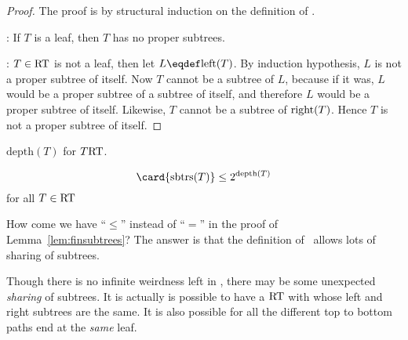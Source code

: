 \begin{proof}
The proof is by structural induction on the definition of \rectree.

: If $T$ is a leaf, then $T$ has no proper
subtrees.

: $T \in \rectree$ is not a leaf, then
let $L \eqdef \leftsub{T}$.  By induction hypothesis, $L$ is not a
proper subtree of itself.  Now $T$ cannot be a subtree of $L$, because
if it was, $L$ would be a proper subtree of a subtree of itself, and
therefore $L$ would be a proper subtree of itself.  Likewise, $T$
cannot be a subtree of $\text{right}(T)$.  Hence $T$ is not a proper
subtree of itself.
\end{proof}

\iffalse
\begin{lemma}\label{lem:finsubtrees}
Every tree in \rectree\ has only a finite number of subtrees.
\end{lemma}

\begin{proof}
The proof is by structural induction on the definition of \rectree.

\inductioncase{Base case}: If $T$ is a leaf, then $T$ has only one
subtree, namely, itself.

\inductioncase{Constructor case}: If $T \in \rectree$ is not a leaf,
then $\card{\subtr{\leftsub{T}}}$ and $\card{\subtr{\rightsub{T}}}$ are
finite by induction hypothesis.  Therefore
\[
\card{\subtr{T}} \leq 1 + \card{\subtr{\leftsub{T}}} +
\card{\subtr{\rightsub{T}}}.
\]
\end{proof}
\fi

\begin{definition}
$\text{depth}(T)$ for $T \text{RT}$.
\end{definition}

\begin{lemma}\label{}
\[
\card{\subtr{T}} \leq 2^{\text{depth}(T)}
\]
for all $T \in \rectree$
\end{lemma}

\iffalse
How come we have ``$\leq$'' instead of ``$=$'' in the proof of
Lemma~\ref{lem:finsubtrees}?  The answer is that the definition of
\rectree\ allows lots of sharing of subtrees.

Though there is no infinite weirdness left in \rectree, there may be
some unexpected \emph{sharing} of subtrees.  It is actually is
possible to have a $\text{RT}$ with whose left and right subtrees are
the same.  It is also possible for all the different top to bottom
paths end at the \emph{same} leaf.

